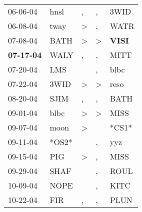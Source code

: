 \begin{supertabular}{p{0.07\textwidth}p{0.06\textwidth}p{0.02\textwidth}p{0.02\textwidth}p{0.06\textwidth}}
          06-06-04\textsuperscript{} &           hnsl\textsuperscript{} &                , &                , &           3WID\textsuperscript{} \\
          06-08-04\textsuperscript{} &           tway\textsuperscript{} &     \textgreater &                , &           WATR\textsuperscript{} \\
          07-08-04\textsuperscript{} &           BATH\textsuperscript{} &     \textgreater &     \textgreater &  \textbf{VISI\textsuperscript{}} \\
 \textbf{07-17-04\textsuperscript{}} &           WALY\textsuperscript{} &                , &                , &           MITT\textsuperscript{} \\
          07-20-04\textsuperscript{} &            LMS\textsuperscript{} &                  &                , &           blbc\textsuperscript{} \\
          07-22-04\textsuperscript{} &           3WID\textsuperscript{} &     \textgreater &     \textgreater &           reso\textsuperscript{} \\
          08-20-04\textsuperscript{} &           SJIM\textsuperscript{} &                , &                , &           BATH\textsuperscript{} \\
          09-01-04\textsuperscript{} &           blbc\textsuperscript{} &     \textgreater &     \textgreater &           MISS\textsuperscript{} \\
          09-07-04\textsuperscript{} &           moon\textsuperscript{} &     \textgreater &                  &                            *CS1* \\
          09-11-04\textsuperscript{} &                            *OS2* &                  &                , &            yyz\textsuperscript{} \\
          09-15-04\textsuperscript{} &            PIG\textsuperscript{} &     \textgreater &                , &           MISS\textsuperscript{} \\
          09-29-04\textsuperscript{} &           SHAF\textsuperscript{} &                  &                , &           ROUL\textsuperscript{} \\
          10-09-04\textsuperscript{} &           NOPE\textsuperscript{} &                  &                , &           KITC\textsuperscript{} \\
          10-22-04\textsuperscript{} &            FIR\textsuperscript{} &                , &                , &           PLUN\textsuperscript{} \\

\end{supertabular}
